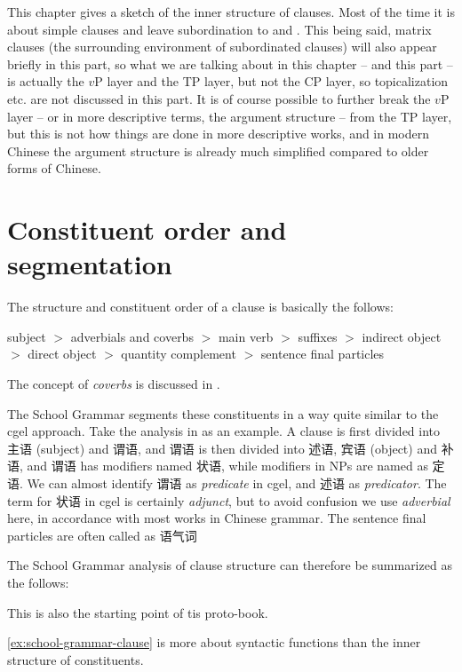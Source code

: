 \documentclass[../main.tex]{subfiles}
\begin{document}
This chapter gives a sketch of the inner structure of clauses.
Most of the time it is about simple clauses and leave subordination to  and .
This being said, matrix clauses (the surrounding environment of subordinated clauses)
will also appear briefly in this part, so what we are talking about in this chapter -- and this part -- is 
actually the $v$P layer and the TP layer, but not the CP layer, so topicalization etc. are not 
discussed in this part. It is of course possible 
to further break the $v$P layer -- or in more descriptive terms, the argument structure 
-- from the TP layer, but this is not how things are done in more descriptive works, and in modern Chinese 
the argument structure is already much simplified compared to older forms of Chinese.

\section{Constituent order and segmentation}

The structure and constituent order of a clause is basically the follows:
\begin{exe}
    \ex\label{ex:clause-order} subject $>$ adverbials and coverbs $>$ main verb $>$ suffixes $>$ indirect object $>$ direct object $>$ quantity complement $>$ sentence final particles
\end{exe}
The concept of \emph{coverbs} is discussed in .

The School Grammar segments these constituents in a way quite similar to the \ac{cgel} approach. 
Take the analysis in \citet[chap. 5]{xianhan2004} as an example.
A clause is first divided into 主语 (subject) and 谓语, and 谓语 is then divided into 述语, 宾语 (object) and 补语,
and 谓语 has modifiers named 状语, while modifiers in NPs are named as 定语. We can almost identify 
谓语 as \emph{predicate} in \ac{cgel}, and 述语 as \emph{predicator}. 
The term for 状语 in \ac{cgel} is certainly \emph{adjunct}, but to avoid confusion we use \emph{adverbial}
here, in accordance with most works in Chinese grammar. 
The sentence final particles are often called as 语气词 %

The School Grammar analysis of clause structure can therefore be summarized as the follows:
\begin{exe}
    \ex\label{ex:school-grammar-clause} 
    
\end{exe}
This is also the starting point of tis proto-book. 

\eqref{ex:school-grammar-clause} is more about syntactic functions than the inner structure of constituents.

\end{document}
